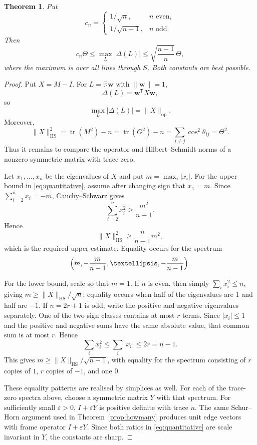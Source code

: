 \documentclass[10pt,a4paper]{amsart}
\newtheorem{theorem}{Theorem}
\newcommand{\HS}{\mathrm{HS}}
\newcommand{\R}{\mathbb{R}}
\newcommand{\T}{\mathsf{T}}
\newcommand{\bw}{\mathbf w}
\newcommand{\norm}[1]{\lVert #1 \rVert}
\DeclareMathOperator{\tr}{tr}
\begin{document}
\begin{theorem}\label{thm:quantitative}
Put
\[
c_n=
\begin{cases}
1/\sqrt n,& n\text{ even},\\[2pt]
1/\sqrt{n-1},& n\text{ odd}.
\end{cases}
\]
Then
\begin{equation}\label{eq:quantitative}
c_n\Theta
\le
\max_L|\Delta(L)|
\le
\sqrt{\frac{n-1}{n}}\,\Theta,
\end{equation}
where the maximum is over all lines through $S$. Both constants are best possible.
\end{theorem}

\begin{proof}
Put $X=M-I$. For $L=\R\bw$ with $\norm\bw=1$,
\[
\Delta(L)=\bw^{\T}X\bw,
\]
so
\[
\max_L|\Delta(L)|=\norm{X}_{\mathrm{op}}.
\]
Moreover,
\[
\norm{X}_{\HS}^2
=
\tr(M^2)-n
=
\tr(G^2)-n
=
\sum_{i\ne j}\cos^2\theta_{ij}
=
\Theta^2.
\]
Thus it remains to compare the operator and Hilbert--Schmidt norms of a nonzero symmetric
matrix with trace zero.

Let $x_1,\ldots,x_n$ be the eigenvalues of $X$ and put
$m=\max_i|x_i|$. For the upper bound in \eqref{eq:quantitative}, assume after changing
sign that $x_1=m$. Since $\sum_{i=2}^{n}x_i=-m$, Cauchy--Schwarz gives
\[
\sum_{i=2}^{n}x_i^2\ge\frac{m^2}{n-1}.
\]
Hence
\[
\norm{X}_{\HS}^2\ge\frac{n}{n-1}m^2,
\]
which is the required upper estimate. Equality occurs for the spectrum
\[
\Bigl(m,-\frac{m}{n-1},\ldots,-\frac{m}{n-1}\Bigr).
\]

For the lower bound, scale so that $m=1$. If $n$ is even, then simply
$\sum_i x_i^2\le n$, giving $m\ge\norm{X}_{\HS}/\sqrt n$; equality occurs when half of the
eigenvalues are $1$ and half are $-1$. If $n=2r+1$ is odd, write the positive and negative eigenvalues separately. One of the two
sign classes contains at most $r$ terms. Since $|x_i|\le1$ and the positive and negative
sums have the same absolute value, that common sum is at most $r$. Hence
\[
\sum_i x_i^2\le\sum_i|x_i|\le2r=n-1.
\]
This gives $m\ge\norm{X}_{\HS}/\sqrt{n-1}$, with equality for the spectrum consisting of
$r$ copies of $1$, $r$ copies of $-1$, and one $0$.

These equality patterns are realised by simplices as well. For each of
the trace-zero spectra above, choose a symmetric matrix $Y$ with that spectrum. For
sufficiently small $\varepsilon>0$, $I+\varepsilon Y$ is positive definite with trace $n$.
The same Schur--Horn argument used in Theorem~\ref{prop:howmany} produces unit edge vectors
with frame operator $I+\varepsilon Y$. Since both ratios in \eqref{eq:quantitative} are
scale invariant in $Y$, the constants are sharp.
\end{proof}
\end{document}
